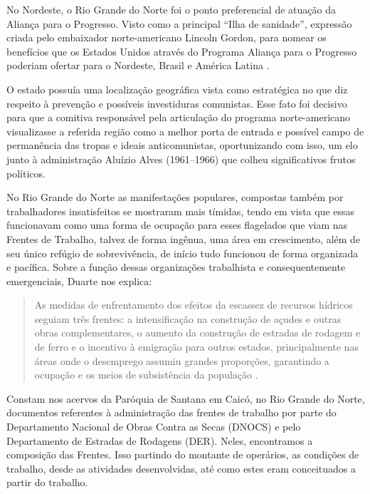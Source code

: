 \begin{refsection}
    No Nordeste, o Rio Grande do Norte foi o ponto preferencial de atuação da Aliança para o Progresso. Visto como a principal ``Ilha de sanidade'', expressão criada pelo embaixador norte-americano Lincoln Gordon, para nomear os benefícios que os Estados Unidos através do Programa Aliança para o Progresso poderiam ofertar para o Nordeste, Brasil e América Latina \cite[p.~27]{Pereira2005Criar}.

    O estado possuía uma localização geográfica vista como estratégica no que diz respeito à prevenção e possíveis investiduras comunistas. Esse fato foi decisivo para que a comitiva responsável pela articulação do programa norte-americano visualizasse a referida região como a melhor porta de entrada e possível campo de permanência das tropas e ideais anticomunistas, oportunizando com isso, um elo junto à administração Aluízio Alves (1961--1966) que colheu significativos frutos políticos. 

    No Rio Grande do Norte as manifestações populares, compostas também por trabalhadores insatisfeitos se mostraram mais tímidas, tendo em vista que essas funcionavam como uma forma de ocupação para esses flagelados que viam nas Frentes de Trabalho, talvez de forma ingênua, uma área em crescimento, além de seu único refúgio de sobrevivência, de início tudo funcionou de forma organizada e pacífica. Sobre a função dessas organizações trabalhista e consequentemente emergenciais, Duarte nos explica:

    \begin{quotation}
        As medidas de enfrentamento dos efeitos da escassez de recursos hídricos seguiam três frentes: a intensificação na construção de açudes e outras obras complementares, o aumento da construção de estradas de rodagem e de ferro e o incentivo à emigração para outros estados, principalmente nas áreas onde o desemprego assumiu grandes proporções, garantindo a ocupação e os meios de subsistência da população \cite[p.~33]{Duarte2002Seca}.
    \end{quotation}

    Constam nos acervos da Paróquia de Santana em Caicó, no Rio Grande do Norte, documentos referentes à administração das frentes de trabalho por parte do Departamento Nacional de Obras Contra as Secas (DNOCS) e pelo Departamento de Estradas de Rodagens (DER). Neles, encontramos a composição das Frentes. Isso partindo do montante de operários, as condições de trabalho, desde as atividades desenvolvidas, até como estes eram conceituados a partir do trabalho. 


\end{refsection}
